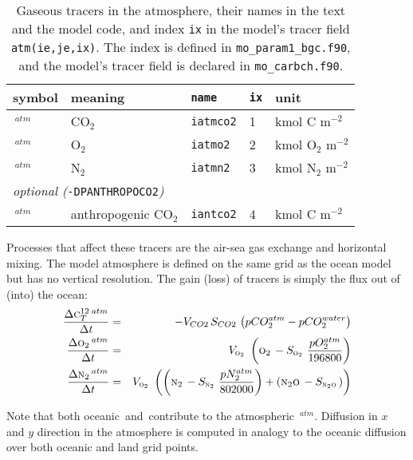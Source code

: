 \documentclass[11pt,a4paper,fleqn,twoside]{article}
\def\ntwo{\text{\textsc{n$_2$}}\,}
\def\ntwoo{\text{\textsc{n$_2$o}}\,}
\def\car{\text{\textsc{c$_T^{12}$}}\,}
\def\oxy{\text{\textsc{o$_2$}}\,}
\def\Acar{\text{\textsc{c$_T^A$}}\,}
\begin{document}
\begin{table}[hbt]
\caption{\label{tab_atmospheric_tracers} Gaseous tracers in the atmosphere, their
names in the text and the model code, and index {\tt ix} in the model's tracer field {\tt
atm(ie,je,ix)}.  The index is defined in {\tt mo\_param1\_bgc.f90},  and the
model's tracer field is declared in {\tt mo\_carbch.f90}.} 
\vspace{.2cm}
\begin{center}
\begin{tabular}{lllll} \hline
symbol & meaning        & {\tt name }     & {\tt ix} & unit\\ \hline
\car$^{atm}$ & CO$_2$              & {\tt iatmco2} & 1     &kmol C m$^{-2}$\\
\oxy$^{atm} $& O$_2$           &{\tt iatmo2}  & 2     &kmol O$_2$ m$^{-2}$\\
\ntwo$^{atm}$& N$_2$            & {\tt iatmn2} & 3     &kmol N$_2$ m$^{-2}$\\
\multicolumn{5}{l}{\rule{0mm}{4mm}{\it optional (}{\tt -DPANTHROPOCO2}{\it )}}\\ \hline
\Acar$^{atm}$ & anthropogenic CO$_2$& {\tt iantco2}    & 4   &kmol C m$^{-2}$\\ \hline
\end{tabular}
\end{center}
\end{table}

Processes that affect these tracers are the air-sea gas exchange and horizontal
mixing. The model atmosphere is defined on the same grid as the ocean model but has no vertical resolution. 
The gain (loss) of tracers is simply the flux out of (into)  the ocean:
\begin{eqnarray}
\frac{\Delta  \car^{atm}}{\Delta  t} & = & - V_{CO2}\,
S_{CO2}\,\left(pCO_2^{atm}-pCO_2^{water}\right)\\
\frac{\Delta  \oxy^{atm}}{\Delta  t} & = & V_\oxy\, 
\left(\oxy-S_\oxy\, \frac{pO^{atm}_2}{196800}\right)\\\
\frac{\Delta  \ntwo^{atm}}{\Delta  t} & = & V_\oxy\, \left(
\left(\ntwo-S_\ntwo\,\frac{pN^{atm}_2}{802000}\right) + 
 \left(\ntwoo-S_\ntwoo\right) \right)
\end{eqnarray}

Note that both oceanic \ntwo and \ntwoo contribute to the atmospheric
\ntwo$^{atm}$. Diffusion in $x$ and $y$ direction in the atmosphere is
computed in analogy to the oceanic diffusion over both oceanic and land 
grid points.
\end{document}
